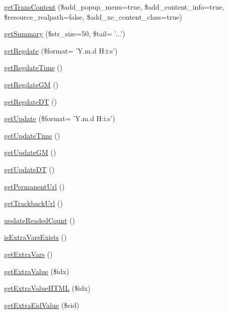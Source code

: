 \begin{DoxyCompactItemize}
\item 
\hyperlink{classdocumentItem_a3143f575cb788ed2317b5697768a6a6f}{get\-Trans\-Content} (\$add\-\_\-popup\-\_\-menu=true, \$add\-\_\-content\-\_\-info=true, \$resource\-\_\-realpath=false, \$add\-\_\-xe\-\_\-content\-\_\-class=true)
\item 
\hyperlink{classdocumentItem_ae79665f63d15ecaeb114d32f1ef37256}{get\-Summary} (\$str\-\_\-size=50, \$tail= '...')
\item 
\hyperlink{classdocumentItem_af648c02eaaf148c374a7bfcdd968ff92}{get\-Regdate} (\$format= 'Y.\-m.\-d H\-:i\-:s')
\item 
\hyperlink{classdocumentItem_ac5d8db0250cc8f448d9a76aaa3afa953}{get\-Regdate\-Time} ()
\item 
\hyperlink{classdocumentItem_a7bd6f9adea145314a87c95b13f6e0bd7}{get\-Regdate\-G\-M} ()
\item 
\hyperlink{classdocumentItem_a30f4ec669361717a82e5dee9c9b3868f}{get\-Regdate\-D\-T} ()
\item 
\hyperlink{classdocumentItem_acdd6ff630a1cc11f2d664fdec740ae0c}{get\-Update} (\$format= 'Y.\-m.\-d H\-:i\-:s')
\item 
\hyperlink{classdocumentItem_a026c6426bea71f9ab86a4f4a7dcff6d9}{get\-Update\-Time} ()
\item 
\hyperlink{classdocumentItem_a6bb6ee1c20e63af811ebd2c6993e898f}{get\-Update\-G\-M} ()
\item 
\hyperlink{classdocumentItem_a05139ae1f3934a4db14e4d73b504f534}{get\-Update\-D\-T} ()
\item 
\hyperlink{classdocumentItem_a8583e18888f4ad634ec23c7cd85dc172}{get\-Permanent\-Url} ()
\item 
\hyperlink{classdocumentItem_a38db599ef3ca4f789475d7e8cceb13da}{get\-Trackback\-Url} ()
\item 
\hyperlink{classdocumentItem_ac268c88d87f12155e5885510213028e3}{update\-Readed\-Count} ()
\item 
\hyperlink{classdocumentItem_ac51058096d79221c90595564e3dbdb82}{is\-Extra\-Vars\-Exists} ()
\item 
\hyperlink{classdocumentItem_afe41c70dfb21cc8b8d397a3af24eb895}{get\-Extra\-Vars} ()
\item 
\hyperlink{classdocumentItem_a5b0cd52819bcb058a7e8a6764aef79d1}{get\-Extra\-Value} (\$idx)
\item 
\hyperlink{classdocumentItem_a0100c3b24a5c4b75b0edc1bfd139e77a}{get\-Extra\-Value\-H\-T\-M\-L} (\$idx)
\item 
\hyperlink{classdocumentItem_a9c2574375684cd06a16532744e279c65}{get\-Extra\-Eid\-Value} (\$eid)

\end{DoxyCompactItemize}
